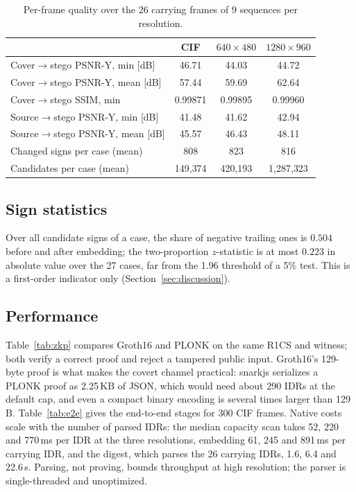 \begin{table}[t]
\centering
\caption{Per-frame quality over the 26 carrying frames of 9 sequences per resolution.}
\label{tab:quality}
\setlength{\tabcolsep}{4pt}
\begin{tabular}{@{}lccc@{}}
\toprule
& CIF & $640\times480$ & $1280\times960$ \\
\midrule
Cover$\to$stego PSNR-Y, min [dB] & 46.71 & 44.03 & 44.72 \\
Cover$\to$stego PSNR-Y, mean [dB] & 57.44 & 59.69 & 62.64 \\
Cover$\to$stego SSIM, min & 0.99871 & 0.99895 & 0.99960 \\
Source$\to$stego PSNR-Y, min [dB] & 41.48 & 41.62 & 42.94 \\
Source$\to$stego PSNR-Y, mean [dB] & 45.57 & 46.43 & 48.11 \\
Changed signs per case (mean) & 808 & 823 & 816 \\
Candidates per case (mean) & 149{,}374 & 420{,}193 & 1{,}287{,}323 \\
\bottomrule
\end{tabular}
\end{table}




\subsection{Sign statistics}
Over all candidate signs of a case, the share of negative trailing ones is $0.504$ before and after embedding; the two-proportion $z$-statistic is at most $0.223$ in absolute value over the 27 cases, far from the 1.96 threshold of a 5\% test. This is a first-order indicator only (Section~\ref{sec:discussion}).

\subsection{Performance}
Table~\ref{tab:zkp} compares Groth16 and PLONK on the same R1CS and witness; both verify a correct proof and reject a tampered public input. Groth16's 129-byte proof is what makes the covert channel practical: snarkjs serializes a PLONK proof as 2.25\,KB of JSON, which would need about 290 IDRs at the default cap, and even a compact binary encoding is several times larger than 129\,B. Table~\ref{tab:e2e} gives the end-to-end stages for 300 CIF frames. Native costs scale with the number of parsed IDRs: the median capacity scan takes 52, 220 and 770\,ms per IDR at the three resolutions, embedding 61, 245 and 891\,ms per carrying IDR, and the digest, which parses the 26 carrying IDRs, 1.6, 6.4 and 22.6\,s. Parsing, not proving, bounds throughput at high resolution; the parser is single-threaded and unoptimized.

